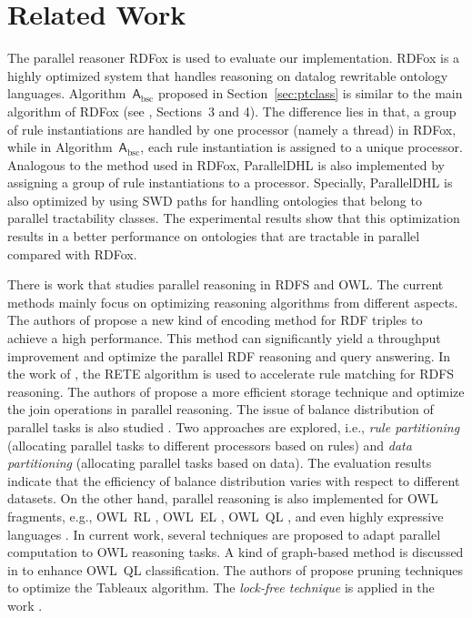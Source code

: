 \section{Related Work}
\label{sec:related}

The parallel reasoner RDFox \cite{MotikNPHO14} is used to evaluate our implementation. RDFox is a highly optimized system that handles reasoning on datalog rewritable ontology languages. Algorithm~$\mathsf{A}_{\text{bsc}}$ proposed in Section~\ref{sec:ptclass} is similar to the main algorithm of RDFox (see \cite{MotikNPHO14}, Sections~3 and 4). The difference lies in that, a group of rule instantiations are handled by one processor (namely a thread) in RDFox, while in Algorithm~$\mathsf{A}_{\text{bsc}}$, each rule instantiation is assigned to a unique processor.
Analogous to the method used in RDFox, ParallelDHL is also implemented by assigning a group of
rule instantiations to a processor.
Specially, ParallelDHL is also optimized by using SWD paths for handling
ontologies that belong to parallel tractability classes.
The experimental results show that this optimization results in a
better performance on ontologies that are
tractable in parallel compared with RDFox.

There is work that studies parallel reasoning in RDFS and OWL. The current methods mainly focus on optimizing reasoning algorithms from different aspects. The authors of \cite{GoodmanJMAAH11} propose a new kind of encoding method for RDF triples to achieve a high performance. This method can significantly yield a throughput improvement and optimize the parallel RDF reasoning and query answering. In the work of \cite{PetersSZ15}, the RETE algorithm is used to accelerate rule matching for RDFS reasoning. The authors of \cite{SubercazeGCL16} propose a more efficient storage technique and optimize the join operations in parallel reasoning. The issue of balance distribution of parallel tasks is also studied \cite{SomaP08,WeaverH09}. Two approaches are explored, i.e., \emph{rule partitioning} (allocating parallel tasks to different processors based on rules) and \emph{data partitioning} (allocating parallel tasks based on data). The evaluation results indicate that the efficiency of balance distribution varies with respect to different datasets. On the other hand, parallel reasoning is also implemented for OWL fragments, e.g., OWL~RL \cite{KolovskiWE10}, OWL~EL \cite{KazakovKS14}, OWL~QL \cite{LemboSS13}, and even highly expressive languages \cite{SteigmillerLG14,LiebigM07,SchlichtS08,WuH12}. In current work, several techniques are proposed to adapt parallel computation to OWL reasoning tasks. A kind of graph-based method is discussed in \cite{LemboSS13} to enhance OWL~QL classification. The authors of \cite{LiebigM07,SchlichtS08,WuH12} propose pruning techniques to optimize the Tableaux algorithm. The \emph{lock-free technique} is applied in the work \cite{KazakovKS14,SteigmillerLG14}.

